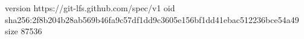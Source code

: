 version https://git-lfs.github.com/spec/v1
oid sha256:2f8b204b28ab569b46fa9c57df1dd9c3605e156bf1dd41ebac512236bce54a49
size 87536
